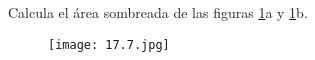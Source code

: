 \question[10] Calcula el área sombreada de las figuras \ref{fig:17.7}a y \ref{fig:17.7}b.

\begin{figure}[H]
    \centering
    \texttt{[image: 17.7.jpg]}
    \label{fig:17.7}
\end{figure}
